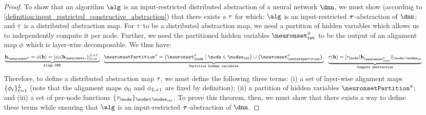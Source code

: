 \begin{proof}
    To show that an algorithm $\alg$ is an input-restricted distributed abstraction of a neural network $\dnn$, we must  show (according to \cref{definition:input_restricted_constructive_abstraction}) that there exists a $\tau$ for which: $\alg$ is an input-restricted $\boldsymbol{\tau}$-abstraction of $\dnn$;
    and $\tau$ is a distributed abstraction map.
    For $\tau$ to be a distributed abstraction map, we need a partition of hidden variables 
    which allows us to independently compute it per node.
    Further, we need the partitioned hidden variables $\neuronsetintcausal$
    to be the output of an alignment map $\phi$ which is layer-wise decomposable.
    We thus have:
    \begin{align}
        \underbrace{\hiddenstates_{\neuronset^{\causalmap}} = \causalmap(\hiddenstates) = [\causalmap_{\layer}(\hiddenstates_{\neuronset_{\layer}})]_{\layer=0}^{\nlayers+1},}_{\texttt{Align DNN}}
        \,\,\,\,
        \underbrace{\neuronsetPartition^{\causalmap} = \{\neuronset^{\causalmap}_{\node} \mid \node \in \nodesint\} \cup \{\neuronset^{\causalmap}_{\uselesspartition}\},}_{\texttt{Partition hidden variables}}
        \,\,\,\,
        \underbrace{\abstractionmap(\hiddenstates) = [\abstractionmap_{\node}(\hiddenstates_{\neuronset^{\causalmap}_{\node}})]_{\node \in \nodesint}}_{\texttt{Compute abstraction}}
    \end{align}
    Therefore, to define a distributed abstraction map $\tau$,
    we must define the following three terms:
    (i) a set of layer-wise alignment maps $\{\phi_{\ell}\}_{\ell=1}^{L}$ (note that the alignment maps $\phi_{0}$ and $\phi_{L+1}$ are fixed by definition);
    (ii) a partition of hidden variables $\neuronsetPartition^{\causalmap}$; and
    (iii) a set of per-node functions $\{\abstractionmap_{\node}\}_{\node \in \nodesint}$.
    To prove this theorem, then, we must show that there exists a way to define these terms while ensuring that $\alg$ is an input-restricted $\boldsymbol{\tau}$-abstraction of $\dnn$.
    

\end{proof}
